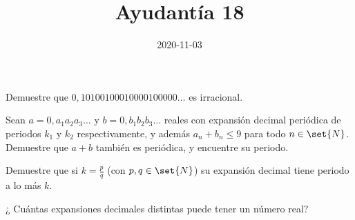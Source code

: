 \documentclass{ayudantia}
\title{Ayudantía 18}
\date{2020-11-03}
\begin{document}
\maketitle

\begin{prob}
    Demuestre que \(0,10100100010000100000\ldots\) es irracional.
\end{prob}

\begin{ans}
    \begin{sol}

    \end{sol}
\end{ans}



\begin{prob}
    Sean \(a=0,a_1a_2a_3\ldots\) y \(b=0,b_1b_2b_3\ldots\) reales con expansión decimal periódica de periodos \(k_1\) y \(k_2\) respectivamente, y además \(a_n+b_n\leq 9\) para todo \(n\in\set{N}\). Demuestre que \(a+b\) también es periódica, y encuentre su periodo.
\end{prob}

\begin{ans}
    \begin{sol}

    \end{sol}
\end{ans}



\begin{prob}
    Demuestre que si \(k=\frac{p}q\) (con \(p,q\in\set{N}\)) su expansión decimal tiene periodo a lo más \(k\).
\end{prob}

\begin{ans}
    \begin{sol}

    \end{sol}
\end{ans}



\begin{prob}
    ¿ Cuántas expansiones decimales distintas puede tener un número real?
\end{prob}

\begin{ans}
    \begin{sol}

    \end{sol}
\end{ans}
\end{document}
